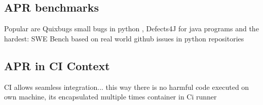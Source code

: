 \subsection{APR benchmarks}
Popular are Quixbugs small bugs in python , Defects4J for java programs and the hardest: SWE Bench based on real world github issues in python repositories


\subsection{APR in CI Context}

CI allows seamless integration...
this way there is no harmful code executed on own machine, its encapsulated multiple times container in Ci runner
